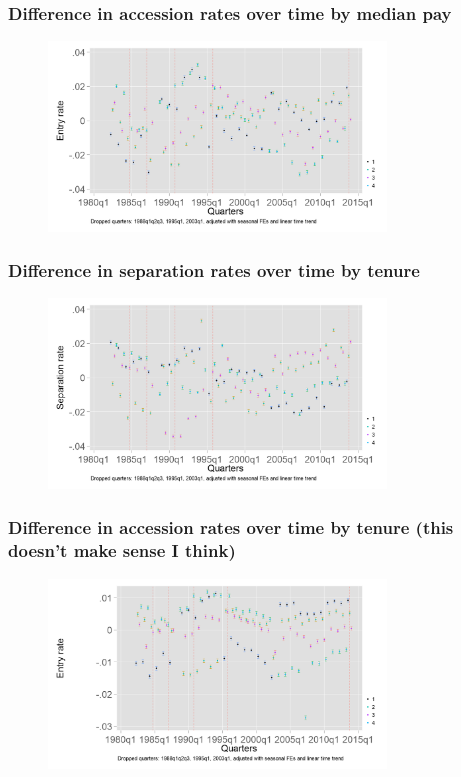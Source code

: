 \documentclass[aspectratio=169]{beamer}
\begin{document}
\begin{frame}
    \frametitle{Difference in accession rates over time by median pay}

    \begin{figure}[]
        \centering
        \includegraphics[width=0.8\textwidth]{../output/accession_rate_med_pay.png}
    \end{figure}

\end{frame}

\begin{frame}
    \frametitle{Difference in separation rates over time by tenure}

    \begin{figure}[]
        \centering
        \includegraphics[width=0.8\textwidth]{../output/separation_rate_med_los.png}
    \end{figure}

\end{frame}

\begin{frame}
    \frametitle{Difference in accession rates over time by tenure (this doesn't make sense I think)}

    \begin{figure}[]
        \centering
        \includegraphics[width=0.8\textwidth]{../output/accession_rate_med_los.png}
    \end{figure}

\end{frame}
\end{document}
